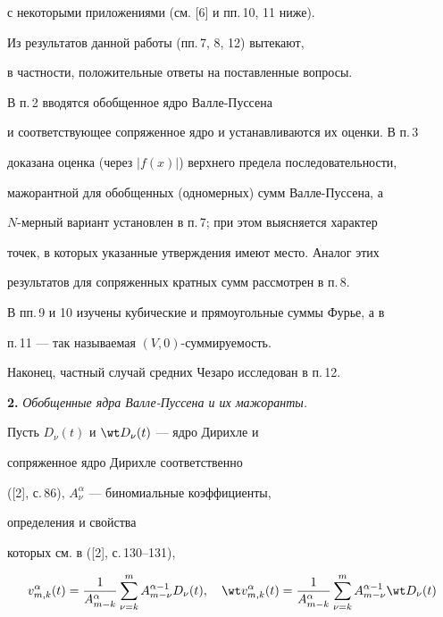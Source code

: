 с некоторыми приложениями (см. [6] и пп.\,10, 11 ниже).


Из результатов данной работы (пп.\,7, 8, 12) вытекают,


в частности, положительные ответы на поставленные вопросы. 





В п.\,2 вводятся обобщенное ядро Валле-Пуссена


и соответствующее сопряженное ядро и устанавливаются их оценки. В п.\,3


доказана оценка (через $|f(x)|$) верхнего предела последовательности,


мажорантной для обобщенных (одномерных) сумм Валле-Пуссена, а 


$N$-мерный вариант установлен в п.\,7; при этом выясняется характер


точек, в которых указанные утверждения имеют место. Аналог этих


результатов для сопряженных кратных сумм рассмотрен в п.\,8.


В пп.\,9 и 10 изучены кубические и прямоугольные суммы Фурье, а в


п.\,11 --- так называемая $(V,0)$-суммируемость.


Наконец, частный случай средних Чезаро исследован в п.\,12.


\medskip





\addtocounter{section}{1}


\setcounter{equation}{0}


\setcounter{lems}{0}


\setcounter{thms}{0}








{\bf 2.} {\it Обобщенные ядра Валле-Пуссена и их мажоранты.}


Пусть $D_\nu (t)$ и $\wt D_\nu (t)$ --- ядро Дирихле и


сопряженное ядро Дирихле соответственно


([2], с.\,86), $A_{\nu}^{\alpha}$ --- биномиальные коэффициенты,


определения и свойства


которых см. в ([2], с.\,130--131),


\begin{equation}


v_{m, k}^{\alpha}(t)=\frac{1}{A_{m-k}^{\alpha}}\sum_{\nu=k}^m


A_{m-\nu}^{\alpha -1} D_\nu (t), \quad


\wt v_{ m, k}^{\alpha}(t)=\frac{1}{A_{m-k}^{\alpha}}\sum_{\nu=k}^m


A_{m-\nu}^{\alpha -1} \wt D_\nu (t)


\end{equation}


